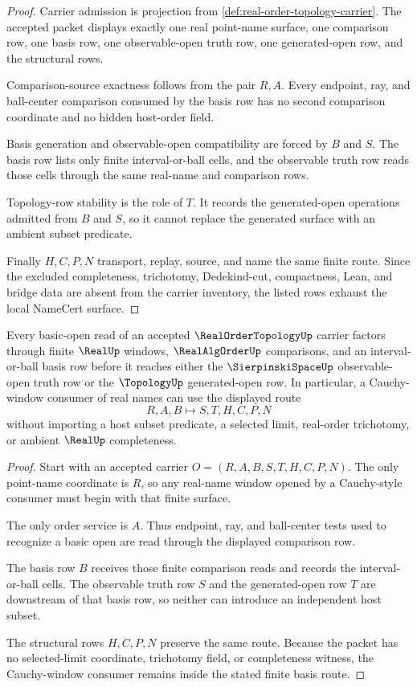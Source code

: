 \begin{proof}
Carrier admission is projection from \autoref{def:real-order-topology-carrier}. The accepted packet displays exactly one real point-name surface, one comparison row, one basis row, one observable-open truth row, one generated-open row, and the structural rows.

Comparison-source exactness follows from the pair $R,A$. Every endpoint, ray, and ball-center comparison consumed by the basis row has no second comparison coordinate and no hidden host-order field.

Basis generation and observable-open compatibility are forced by $B$ and $S$. The basis row lists only finite interval-or-ball cells, and the observable truth row reads those cells through the same real-name and comparison rows.

Topology-row stability is the role of $T$. It records the generated-open operations admitted from $B$ and $S$, so it cannot replace the generated surface with an ambient subset predicate.

Finally $H,C,P,N$ transport, replay, source, and name the same finite route. Since the excluded completeness, trichotomy, Dedekind-cut, compactness, Lean, and bridge data are absent from the carrier inventory, the listed rows exhaust the local NameCert surface.
\end{proof}

\begin{theorem}
\label{thm:real-order-topology-cauchy-window-basis}
Every basic-open read of an accepted $\RealOrderTopologyUp$ carrier factors through finite $\RealUp$ windows, $\RealAlgOrderUp$ comparisons, and an interval-or-ball basis row before it reaches either the $\SierpinskiSpaceUp$ observable-open truth row or the $\TopologyUp$ generated-open row. In particular, a Cauchy-window consumer of real names can use the displayed route
$$
R,A,B \longmapsto S,T,H,C,P,N
$$
without importing a host subset predicate, a selected limit, real-order trichotomy, or ambient $\RealUp$ completeness.
\end{theorem}
\begin{proof}
Start with an accepted carrier $O=(R,A,B,S,T,H,C,P,N)$. The only point-name coordinate is $R$, so any real-name window opened by a Cauchy-style consumer must begin with that finite surface.

The only order service is $A$. Thus endpoint, ray, and ball-center tests used to recognize a basic open are read through the displayed comparison row.

The basis row $B$ receives those finite comparison reads and records the interval-or-ball cells. The observable truth row $S$ and the generated-open row $T$ are downstream of that basis row, so neither can introduce an independent host subset.

The structural rows $H,C,P,N$ preserve the same route. Because the packet has no selected-limit coordinate, trichotomy field, or completeness witness, the Cauchy-window consumer remains inside the stated finite basis route.
\end{proof}


